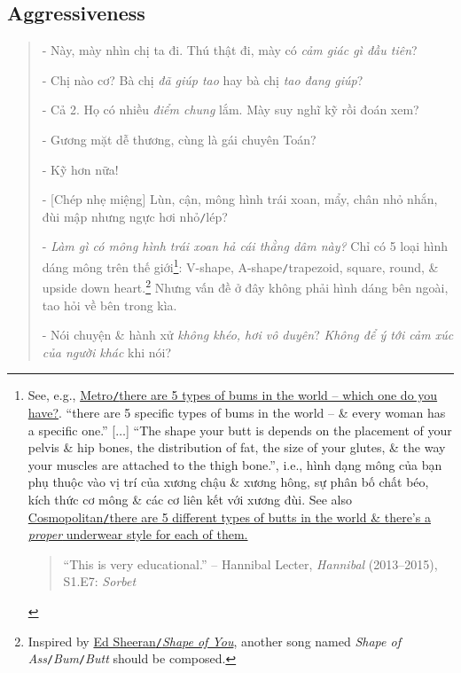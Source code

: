 \documentclass[12pt,oneside]{book}
\begin{document}
\subsection{Aggressiveness}
\begin{quotation}
	- Này, mày nhìn chị ta đi. Thú thật đi, mày có {\it cảm giác gì đầu tiên}?
	
	- Chị nào cơ? Bà chị {\it đã giúp tao} hay bà chị {\it tao đang giúp}?
	
	- Cả 2. Họ có nhiều {\it điểm chung} lắm. Mày suy nghĩ kỹ rồi đoán xem?
	
	- Gương mặt dễ thương, cùng là gái chuyên Toán?
	
	- Kỹ hơn nữa!
	
	- [Chép nhẹ miệng] Lùn, cận, mông hình trái xoan, mẩy, chân nhỏ nhắn, đùi mập nhưng ngực hơi nhỏ{\tt/}lép?
	
	- {\it Làm gì có mông hình trái xoan hả cái thằng dâm này?} Chỉ có 5 loại hình dáng mông trên thế giới\footnote{See, e.g., \href{https://metro.co.uk/2016/04/15/there-are-five-types-of-bums-in-the-world-which-one-do-you-have-5819927/}{Metro{\tt/}there are 5 types of bums in the world -- which one do you have?}. ``there are 5 specific types of bums in the world -- \& every woman has a specific one.'' [$\ldots$] ``The shape your butt is depends on the placement of your pelvis \& hip bones, the distribution of fat, the size of your glutes, \& the way your muscles are attached to the thigh bone.'', i.e., hình dạng mông của bạn phụ thuộc vào vị trí của xương chậu \& xương hông, sự phân bố chất béo, kích thức cơ mông \& các cơ liên kết với xương đùi. See also \href{https://www.cosmopolitan.com/health-fitness/a56412/there-are-5-different-types-of-butts-in-the-world/}{Cosmopolitan{\tt/}there are  5 different types of butts in the world \& there's a {\it proper} underwear style for each of them.}
		
		\begin{quotation}
			``This is very educational.'' -- Hannibal Lecter, {\it Hannibal} (2013--2015), S1.E7: {\it Sorbet}
	\end{quotation}}: V-shape, A-shape{\tt/}trapezoid, square, round, \& upside down heart.\footnote{Inspired by \href{https://www.youtube.com/watch?v=JGwWNGJdvx8}{Ed Sheeran{\tt/}{\it Shape of You}}, another song named {\it Shape of Ass}{\tt/}{\it Bum}{\tt/}{\it Butt} should be composed.} Nhưng vấn đề ở đây không phải hình dáng bên ngoài, tao hỏi về bên trong kìa.
	
	- Nói chuyện \& hành xử {\it không khéo, hơi vô duyên}? {\it Không để ý tới cảm xúc của người khác} khi nói?
	

\end{quotation}
\end{document}
